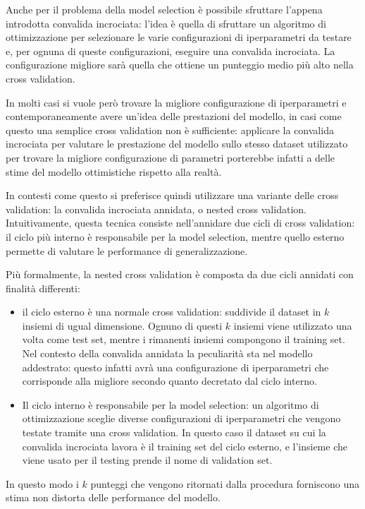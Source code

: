 \documentclass[../../main.tex]{subfiles}
\begin{document}
    Anche per il problema della model selection è possibile sfruttare l'appena introdotta convalida incrociata: l'idea è quella di sfruttare un algoritmo di ottimizzazione per selezionare le varie configurazioni di iperparametri da testare e, per ognuna di queste configurazioni, eseguire una convalida incrociata. La configurazione migliore sarà quella che ottiene un punteggio medio più alto nella cross validation.
    
    In molti casi si vuole però trovare la migliore configurazione di iperparametri e contemporaneamente avere un'idea delle prestazioni del modello, in casi come questo una semplice cross validation non è sufficiente: applicare la convalida incrociata per valutare le prestazione del modello sullo stesso dataset utilizzato per trovare la migliore configurazione di parametri porterebbe infatti a delle stime del modello ottimistiche rispetto alla realtà.

    In contesti come questo si preferisce quindi utilizzare una variante delle cross validation: la convalida incrociata annidata, o nested cross validation. Intuitivamente, questa tecnica consiste nell'annidare due cicli di cross validation: il ciclo più interno è responsabile per la model selection, mentre quello esterno permette di valutare le performance di generalizzazione.

    Più formalmente, la nested cross validation è composta da due cicli annidati con finalità differenti: 
    \begin{itemize}
        \item il ciclo esterno è una normale cross validation: suddivide il dataset in $k$ insiemi di ugual dimensione. Ognuno di questi $k$ insiemi viene utilizzato una volta come test set, mentre i rimanenti insiemi compongono il training set. Nel contesto della convalida annidata la peculiarità sta nel modello addestrato: questo infatti avrà una configurazione di iperparametri che corrisponde alla migliore secondo quanto decretato dal ciclo interno.
        \item Il ciclo interno è responsabile per la model selection: un algoritmo di ottimizzazione sceglie diverse configurazioni di iperparametri che vengono testate tramite una cross validation. In questo caso il dataset su cui la convalida incrociata lavora è il training set del ciclo esterno, e l'insieme che viene usato per il testing prende il nome di validation set.
    \end{itemize}
    In questo modo i $k$ punteggi che vengono ritornati dalla procedura forniscono una stima non distorta delle performance del modello.
\end{document}
